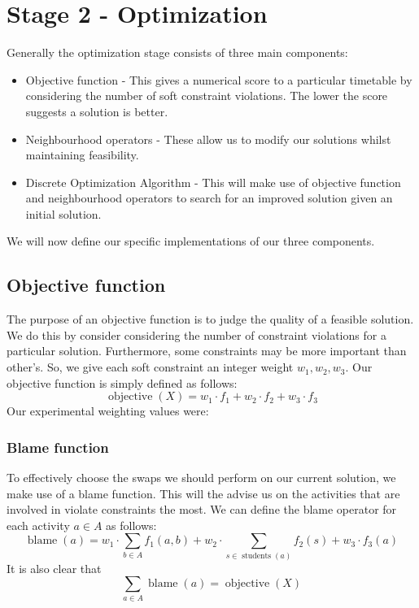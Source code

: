 \documentclass[12pt]{article}
\theoremstyle{definition}
\theoremstyle{plain}
\DeclareMathOperator{\students}{students}
\DeclareMathOperator{\obj}{objective}
\DeclareMathOperator{\blame}{blame}
\begin{document}
\section{Stage 2 - Optimization}
Generally the optimization stage consists of three main components:
\begin{itemize}
	\item Objective function - This gives a numerical score to a particular timetable by considering the number of soft constraint violations. The lower the score suggests a solution is better.
	\item Neighbourhood operators - These allow us to modify our solutions whilst maintaining feasibility.
	\item Discrete Optimization Algorithm - This will make use of objective function and neighbourhood operators to search for an improved solution given an initial solution.
\end{itemize}

We will now define our specific implementations of our three components.

\subsection{Objective function}

The purpose of an objective function is to judge the quality of a feasible solution. We do this by consider considering the number of constraint violations for a particular solution. Furthermore,  some constraints may be more important than other's. So, we give each soft constraint an integer weight $w_1, w_2, w_3$. Our objective function is simply defined as follows:
\begin{equation*}
	\obj(X) = w_1\cdot f_1 + w_2 \cdot f_2 + w_3 \cdot f_3
\end{equation*}
Our experimental weighting values were:

\subsubsection{Blame function}

To effectively choose the swaps we should perform on our current solution, we make use of a blame function. This will the advise us on the activities that are involved in violate constraints the most. We can define the blame operator for each activity $a \in A$ as follows:
\begin{equation*}
	\blame(a) = w_1 \cdot \sum_{b\in A}f_1(a,b) + w_2 \cdot \sum_{s \in \students(a)}f_2(s) + w_3 \cdot f_3(a)
\end{equation*}
It is also clear that
\begin{equation*}
 \sum_{a \in A} \blame(a) = \obj(X)
\end{equation*}
\end{document}
